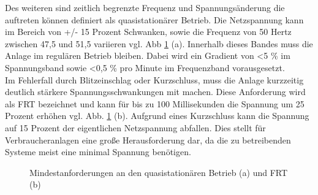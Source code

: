 Des weiteren sind zeitlich begrenzte Frequenz und Spannungsänderung die auftreten können definiert als quasistationärer Betrieb. Die Netzspannung kann im Bereich von +/- 15 Prozent Schwanken, sowie die Frequenz von 50 Hertz zwischen 47,5 und 51,5 variieren vgl. Abb \ref{fig:vde4120-Anforderungen} (a). Innerhalb dieses Bandes muss die Anlage im regulären Betrieb bleiben. Dabei wird ein Gradient von  <5 \%  im Spannungsband sowie <0,5 \% pro Minute im Frequenzband vorausgesetzt. \\
Im Fehlerfall durch Blitzeinschlag oder Kurzschluss, muss die Anlage kurzzeitig deutlich stärkere Spannungsschwankungen mit machen. Diese Anforderung wird als \gls{FRT} bezeichnet und kann für bis zu 100 Millisekunden die Spannung um 25 Prozent erhöhen vgl. Abb. \ref{fig:vde4120-Anforderungen} (b). Aufgrund eines Kurzschluss kann die Spannung auf 15 Prozent der eigentlichen Netzspannung abfallen. Dies stellt für Verbraucheranlagen eine große Herausforderung dar, da die zu betreibenden Systeme meist eine minimal Spannung benötigen.

\begin{figure}[H]
\centering
{}%

\qquad
{}%

\caption[quasistationären Betrieb (a) und \gls{FRT} (b)]{Mindestanforderungen an den quasistationären Betrieb (a) und \gls{FRT} (b)}
\label{fig:vde4120-Anforderungen}
\end{figure}




